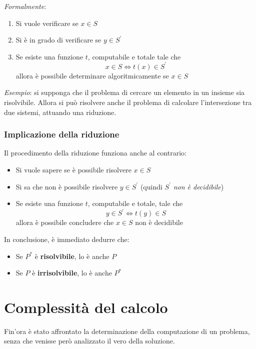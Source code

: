 \documentclass[italian, 10pt]{article}
\begin{document}
\textit{Formalmente}:

\begin{enumerate}
  \item Si vuole verificare se \(x \in S\)
  \item Si è in grado di verificare se \(y \in S^\prime\)
  \item Se esiste una funzione \(t\), computabile e totale tale che \[ x \in S \Leftrightarrow t(x) \in S^\prime \] allora è possibile determinare algoritmicamente se \(x \in S\)
\end{enumerate}

\bigskip
\textit{Esempio}: si supponga che il problema di cercare un elemento in un insieme sia risolvibile.
Allora si può risolvere anche il problema di calcolare l'intersezione tra due sistemi, attuando una riduzione.

\subsubsection{Implicazione della riduzione}

Il procedimento della riduzione funziona anche al contrario:

\begin{itemize}
  \item Si vuole sapere se è possibile risolvere \(x \in S\)
  \item Si sa che non è possibile risolvere \(y \in S^\prime\) (quindi \(S^\prime\) \textit{non è decidibile})
  \item Se esiste una funzione \(t\), computabile e totale, tale che \[ y \in S^\prime \Leftrightarrow t(y) \in S \] allora è possibile concludere che \(x \in S\) non è decidibile
\end{itemize}

In conclusione, è immediato dedurre che:

\begin{itemize}
  \item Se \(P^\ast\) è \textbf{risolvibile}, lo è anche \(P\)
  \item Se \(P\) è \textbf{irrisolvibile}, lo è anche \(P^\ast\)
\end{itemize}

\clearpage

\section{Complessità del calcolo}

Fin'ora è stato affrontato la determinazione della computazione di un problema, senza che venisse però analizzato il vero  della soluzione.
\end{document}
